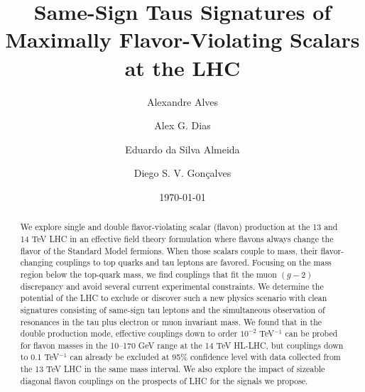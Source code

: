 \documentclass[prd,amsfonts,onecolumn,superscriptaddress,aps,nofootinbib,11pt]{revtex4-1}
\begin{document}
	
\title{ %
Same-Sign Taus Signatures of Maximally Flavor-Violating Scalars at the LHC }

\author{Alexandre Alves}
\author{Alex G. Dias}
\author{Eduardo da Silva Almeida}
\author{Diego S. V. Gon\c{c}alves}

\date{\today}
	
\begin{abstract}
We explore single and double flavor-violating scalar (flavon) production at the 13 and 14 TeV LHC in an effective field theory formulation where flavons always change the flavor of the Standard Model fermions. When those scalars couple to mass, their flavor-changing couplings to top quarks and tau leptons are favored. Focusing on the mass region below the top-quark mass, we find couplings that fit the muon $(g-2)$ discrepancy and avoid several current experimental constraints. We determine the potential of the LHC to exclude or discover such a new physics scenario with clean signatures consisting of same-sign tau leptons and the simultaneous observation of resonances in the tau plus electron or muon invariant mass. We found that in the double production mode, effective couplings down to order $10^{-2}$ TeV$^{-1}$ can be probed for flavon masses in the 10--170 GeV range at the 14 TeV HL-LHC, but couplings down to 0.1 TeV$^{-1}$ can already be excluded at 95\% confidence level with data collected from the 13 TeV LHC in the same mass interval. We also explore the impact of sizeable diagonal flavon couplings on the prospects of LHC for the signals we propose.
\end{abstract}
\end{document}
